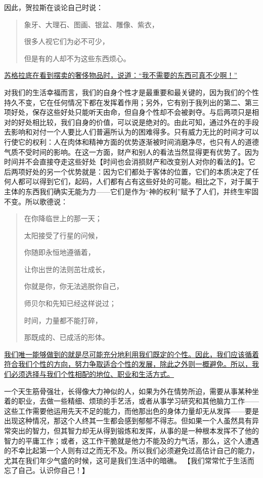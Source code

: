 \documentclass[12pt,oneside]{book}
\begin{document}
因此，贺拉斯在谈论自己时说： 


\begin{quotation}
象牙、大理石、图画、银盆、雕像、紫衣， 

很多人视它们为必不可少， 

但是有的人却不为这些东西烦心。 
\end{quotation}


 

\uline{苏格拉底在看到摆卖的奢侈物品时，说道：“我不需要的东西可真不少啊！”}

对我们的生活幸福而言，我们的自身个性才是最重要和最关键的，因为我们的个性持久不变，它在任何情况下都在发挥着作用；另外，它有别于我列出的第二、第三项好处，保存这些好处只能听天由命，但自身个性却不会被剥夺。与后两项只是相对的好处相比较，我们自身的价值，可以说是绝对的。由此可知，通过外在的手段去影响和对付一个人要比人们普遍所认为的困难得多。只有威力无比的时间才可以行使它的权利：人在肉体和精神方面的优势逐渐被时间消磨净尽，也只有人的道德气质不受时间的影响。在这一方面，财产和别人的看法当然显得更有优势了。因为时间并不会直接夺走这些好处【时间也会消损财产和改变别人对你的看法的】。它后两项好处的另一个优势就是：因为它们都处于客体的位置，它们的本质决定了任何人都可以得到它们，起码，人们都有占有这些好处的可能。相比之下，对于属于主体的东西我们确实无能为力——它们是作为“神的权利”赋予了人们，并终生牢固不变。所以歌德说： 

 
\begin{quotation}
在你降临世上的那一天； 

太阳接受了行星的问候， 

你随即永恒地遵循着， 

让你出世的法则茁壮成长， 

你就是你，你无法逃脱你自己， 

师贝尔和先知已经这样说过； 

 时间，力量都不能打碎， 

那既成的、已成活的形体。 
\end{quotation}


 

\uline{我们唯一能够做到的就是尽可能充分地利用我们既定的个性。因此，我们应该循着符合我们个性的方向，努力争取适合个性的发展，除此之外则一概避免。所以，我们必须选择与我们个性相配的地位、职业和生活方式。}

一个天生筋骨强壮，长得像大力神似的人，如果为外在情势所迫，需要从事某种坐着的职业，去做一些精细、烦琐的手艺活，或者从事学习研究和其他脑力工作——这些工作需要他运用先天不足的能力，而他那出色的身体力量却无从发挥——要是出现这种情况，那这个人终其一生都会感到郁郁不得志。但如果一个人虽然具有异常突出的智力，但其智力却无从得到锻炼和发挥，从事的是一种根本发挥不了他的智力的平庸工作；或者，这工作干脆就是他力不能及的力气活，那么，这个人遭遇的不幸比起第一个人则有过之而无不及。所以我们必须避免过高估计自己的能力，尤其在我们年少气盛的时候，这可是我们生活中的暗礁。 【我们常常忙于生活而忘了自己。认识你自己！】
\end{document}
